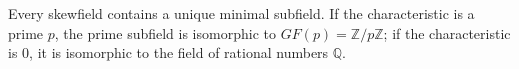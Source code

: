 Every skewfield contains a unique minimal subfield. If the characteristic is a prime $p$, the prime subfield is isomorphic to $GF(p) = \mathbb{Z}/p\mathbb{Z}$; if the characteristic is $0$, it is isomorphic to the field of rational numbers $\mathbb{Q}$.
